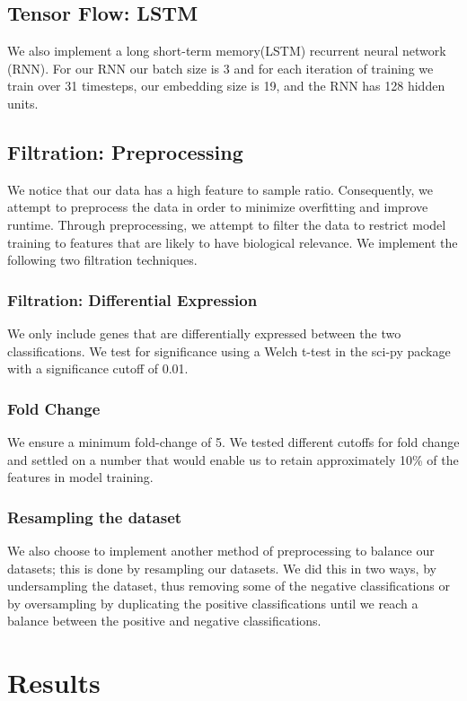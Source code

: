 \documentclass[12pt]{scrartcl}
\begin{document}
    
    \subsection{Tensor Flow: LSTM}
    We also implement a long short-term memory(LSTM) recurrent neural network (RNN). For our RNN our batch size is 3 and for each iteration of training we train over 31 timesteps, our embedding size is 19, and the RNN has 128 hidden units. 
 
    \subsection{Filtration: Preprocessing}
We notice that our data has a high feature to sample ratio. Consequently, we attempt to preprocess the data in order to minimize overfitting and improve runtime. Through preprocessing, we attempt to filter the data to restrict model training to features that are likely to have biological relevance. We implement the following two filtration techniques. 

    \subsubsection{Filtration: Differential Expression}
We only include genes that are differentially expressed between the two classifications. We test for significance using a Welch t-test in the sci-py package with a significance cutoff of 0.01. 
    \subsubsection{Fold Change}
We ensure a minimum fold-change of 5. We tested different cutoffs for fold change and settled on a number that would enable us to retain approximately 10\% of the features in model training.

    \subsubsection{Resampling the dataset}
    We also choose to implement another method of preprocessing to balance our datasets; this is done by resampling our datasets. We did this in two ways, by undersampling the dataset, thus removing some of the negative classifications or by oversampling by duplicating the positive classifications until we reach a balance between the positive and negative classifications. 


    \section{Results}
\end{document}
